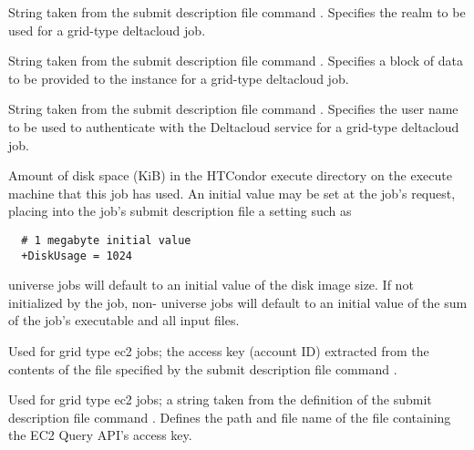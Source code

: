 \begin{description}
\item[\AdAttr{DeltacloudRealmId}:] 
String taken from the submit description file command
.
Specifies the realm to be used for a grid-type deltacloud job.

\item[\AdAttr{DeltacloudUserData}:] 
String taken from the submit description file command
.
Specifies a block of data to be provided to the instance
for a grid-type deltacloud job.

\item[\AdAttr{DeltacloudUsername}:] 
String taken from the submit description file command
.
Specifies the user name to be used to authenticate
with the Deltacloud service for a grid-type deltacloud job.

\item[\AdAttr{DiskUsage}:] Amount of disk space (KiB) in the HTCondor
execute directory on the execute machine that this job has used.
An initial value may be set at the job's request, placing into the
job's submit description file a setting such as
\begin{verbatim}
  # 1 megabyte initial value
  +DiskUsage = 1024
\end{verbatim}
 universe jobs will default to an initial value of the disk
image size. 
If not initialized by the job,
non- universe jobs will default to an initial value of the 
sum of the job's executable and all input files.

\item[\AdAttr{EC2AccessKey}:] 
Used for grid type ec2 jobs;
the access key (account ID) extracted from the contents of
the file specified by the submit description
file command .

\item[\AdAttr{EC2AccessKeyId}:] 
Used for grid type ec2 jobs;
a string taken from the definition of the submit description file command
.
Defines the path and file name of the file containing the EC2 Query API's
access key.


\end{description}
